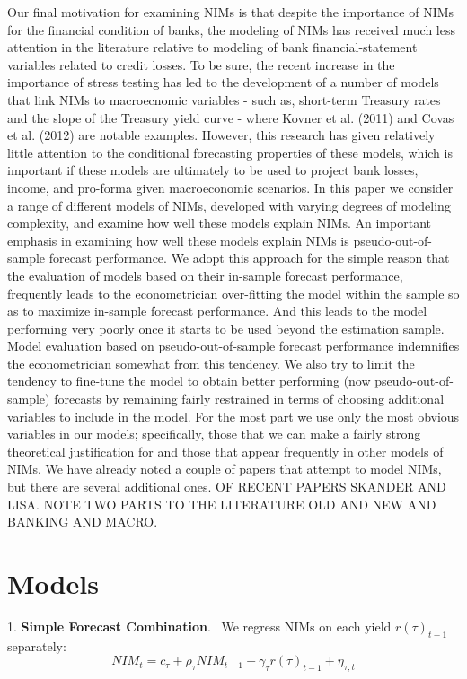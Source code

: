 \documentclass[12pt]{article}
\begin{document}
{\normalsize Our final motivation for examining NIMs is that despite the
importance of NIMs for the financial condition of banks, the modeling of
NIMs has received much less attention in the literature relative to modeling
of bank financial-statement variables related to credit losses. To be sure,
the recent increase in the importance of stress testing has led to the
development of a number of models that link NIMs to macroecnomic variables -
such as, short-term Treasury rates and the slope of the Treasury yield curve
- where Kovner et al. (2011) and Covas et al. (2012) are notable examples.
However, this research has given relatively little attention to the
conditional forecasting properties of these models, which is important if
these models are ultimately to be used to project bank losses, income, and
pro-forma given macroeconomic scenarios. In this paper we consider a range
of different models of NIMs, developed with varying degrees of modeling
complexity, and examine how well these models explain NIMs. An important
emphasis in examining how well these models explain NIMs is
pseudo-out-of-sample forecast performance. We adopt this approach for the
simple reason that the evaluation of models based on their in-sample
forecast performance, frequently leads to the econometrician over-fitting
the model within the sample so as to maximize in-sample forecast
performance. And this leads to the model performing very poorly once it
starts to be used beyond the estimation sample. Model evaluation based on
pseudo-out-of-sample forecast performance indemnifies the econometrician
somewhat from this tendency. We also try to limit the tendency to fine-tune
the model to obtain better performing (now pseudo-out-of-sample) forecasts
by remaining fairly restrained in terms of choosing additional variables to
include in the model. For the most part we use only the most obvious
variables in our models; specifically, those that we can make a fairly
strong theoretical justification for and those that appear frequently in
other models of NIMs. We have already noted a couple of papers that attempt
to model NIMs, but there are several additional ones. OF RECENT PAPERS
SKANDER AND LISA. NOTE TWO PARTS TO THE LITERATURE OLD AND NEW AND BANKING
AND MACRO. }

\section{\protect\normalsize Models}

1. \textbf{Simple Forecast Combination}. \ We regress NIMs on each yield $r(\tau )_{t-1}$ separately: \
\begin{equation*}
NIM_{t}=c_{\tau }+\rho _{\tau }NIM_{t-1}+\gamma _{\tau }r(\tau )_{t-1}+{\eta
_{\tau ,t}}
\end{equation*}
\end{document}
